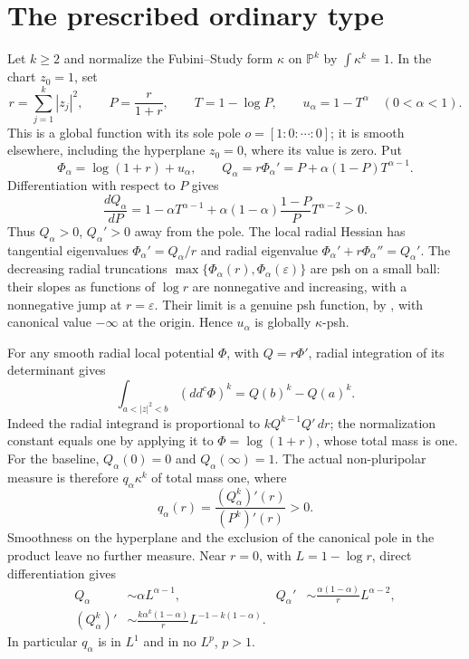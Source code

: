 \documentclass[11pt]{article}
\newcommand{\ddc}{dd^c}
\newcommand{\PP}{\mathbb P}
\theoremstyle{remark}\newtheorem{remark}[theorem]{Remark}
\begin{document}
\section{The prescribed ordinary type}
Let $k\ge2$ and normalize the Fubini--Study form $\kappa$ on
$\PP^k$ by $\int\kappa^k=1$. In the chart $z_0=1$, set
\[
 r=\sum_{j=1}^k|z_j|^2,\qquad P=\frac r{1+r},\qquad
 T=1-\log P,
 \qquad u_\alpha=1-T^\alpha\quad(0<\alpha<1).
\]
This is a global function with its sole pole
$o=[1:0:\cdots:0]$; it is smooth elsewhere, including the hyperplane
$z_0=0$, where its value is zero. Put
\begin{equation}\label{eq:baseline}
 \Phi_\alpha=\log(1+r)+u_\alpha,
 \qquad Q_\alpha=r\Phi_\alpha'
      =P+\alpha(1-P)T^{\alpha-1}.
\end{equation}
Differentiation with respect to $P$ gives
\[
 \frac{dQ_\alpha}{dP}
 =1-\alpha T^{\alpha-1}
  +\alpha(1-\alpha)\frac{1-P}{P}T^{\alpha-2}>0.
\]
Thus $Q_\alpha>0$, $Q_\alpha'>0$ away from the pole.
The local radial Hessian has tangential eigenvalues
$\Phi_\alpha'=Q_\alpha/r$ and radial eigenvalue
$\Phi_\alpha'+r\Phi_\alpha''=Q_\alpha'$.
The decreasing radial truncations
$\max\{\Phi_\alpha(r),\Phi_\alpha(\varepsilon)\}$ are psh on a
small ball: their slopes as functions of $\log r$ are nonnegative
and increasing, with a nonnegative jump at $r=\varepsilon$.
Their limit is a genuine psh function, by
\cite[I.5.4]{Dem}, with canonical value $-\infty$ at the origin.
Hence $u_\alpha$ is globally $\kappa$-psh.

For any smooth radial local potential $\Phi$, with $Q=r\Phi'$,
radial integration of its determinant gives
\begin{equation}\label{eq:flux}
 \int_{a<|z|^2<b}(\ddc\Phi)^k=Q(b)^k-Q(a)^k.
\end{equation}
Indeed the radial integrand is proportional to
$kQ^{k-1}Q'\,dr$; the normalization constant equals one by
applying it to $\Phi=\log(1+r)$, whose total mass is one.
For the baseline, $Q_\alpha(0)=0$ and $Q_\alpha(\infty)=1$.
The actual non-pluripolar measure is therefore
$q_\alpha\kappa^k$ of total mass one, where
\begin{equation}\label{eq:density}
 q_\alpha(r)=\frac{(Q_\alpha^k)'(r)}{(P^k)'(r)}>0.
\end{equation}
Smoothness on the hyperplane and the exclusion of the canonical
pole in the product leave no further measure. Near $r=0$, with
$L=1-\log r$, direct differentiation gives
\begin{align}\label{eq:asymptotics}
 Q_\alpha&\sim\alpha L^{\alpha-1},&
 Q_\alpha'&\sim\frac{\alpha(1-\alpha)}rL^{\alpha-2},\\
 (Q_\alpha^k)'&\sim
 \frac{k\alpha^k(1-\alpha)}rL^{-1-k(1-\alpha)}.\nonumber
\end{align}
In particular $q_\alpha$ is in $L^1$ and in no $L^p$, $p>1$.
\end{document}
